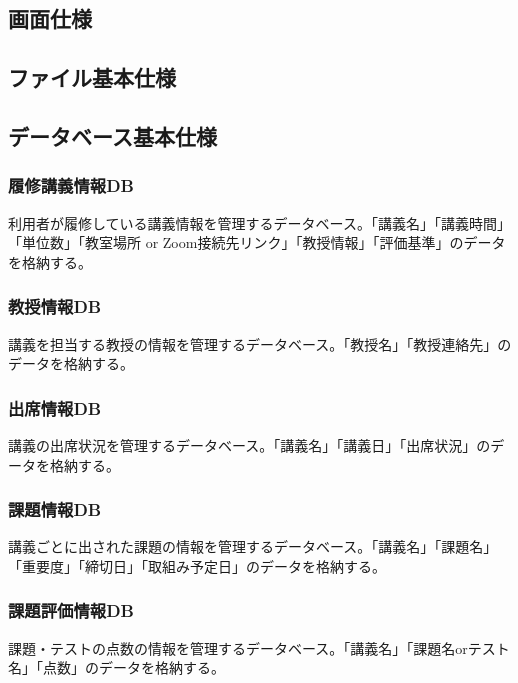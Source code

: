 \documentclass[a4paper, 11pt, titlepage]{jsarticle}
\begin{document}
\subsection{画面仕様}

\subsection{ファイル基本仕様}


\subsection{データベース基本仕様}
\subsubsection{履修講義情報DB}
利用者が履修している講義情報を管理するデータベース。「講義名」「講義時間」「単位数」「教室場所 or Zoom接続先リンク」「教授情報」「評価基準」のデータを格納する。
\subsubsection{教授情報DB}
講義を担当する教授の情報を管理するデータベース。「教授名」「教授連絡先」のデータを格納する。
\subsubsection{出席情報DB}
講義の出席状況を管理するデータベース。「講義名」「講義日」「出席状況」のデータを格納する。
\subsubsection{課題情報DB}
講義ごとに出された課題の情報を管理するデータベース。「講義名」「課題名」「重要度」「締切日」「取組み予定日」のデータを格納する。
\subsubsection{課題評価情報DB}
課題・テストの点数の情報を管理するデータベース。「講義名」「課題名orテスト名」「点数」のデータを格納する。
\end{document}

